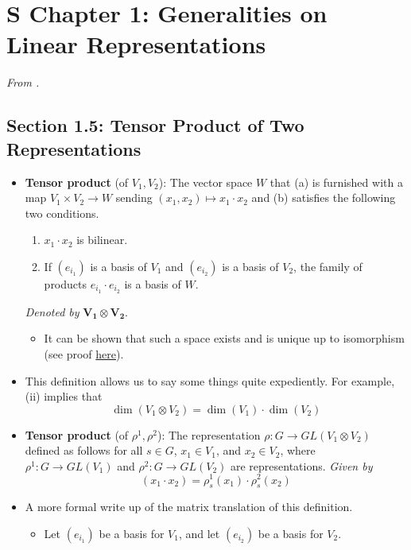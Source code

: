 \documentclass[../notes.tex]{subfiles}
\begin{document}
\section{S Chapter 1: Generalities on Linear Representations}
\emph{From \textcite{bib:Serre}.}
\subsection*{Section 1.5: Tensor Product of Two Representations}
\begin{itemize}
    \item \textbf{Tensor product} (of $V_1,V_2$): The vector space $W$ that (a) is furnished with a map $V_1\times V_2\to W$ sending $(x_1,x_2)\mapsto x_1\cdot x_2$ and (b) satisfies the following two conditions.
    \begin{enumerate}[label={(\roman*)}]
        \item $x_1\cdot x_2$ is bilinear.
        \item If $(e_{i_1})$ is a basis of $V_1$ and $(e_{i_2})$ is a basis of $V_2$, the family of products $e_{i_1}\cdot e_{i_2}$ is a basis of $W$.
    \end{enumerate}
    \emph{Denoted by} $\bm{V_1\otimes V_2}$.
    \begin{itemize}
        \item It can be shown that such a space exists and is unique up to isomorphism (see proof \href{https://www-users.cse.umn.edu/~garrett/m/algebra/notes/27.pdf}{here}).
    \end{itemize}
    \item This definition allows us to say some things quite expediently. For example, (ii) implies that
    \begin{equation*}
        \dim(V_1\otimes V_2) = \dim(V_1)\cdot\dim(V_2)
    \end{equation*}
    \item \textbf{Tensor product} (of $\rho^1,\rho^2$): The representation $\rho:G\to GL(V_1\otimes V_2)$ defined as follows for all $s\in G$, $x_1\in V_1$, and $x_2\in V_2$, where $\rho^1:G\to GL(V_1)$ and $\rho^2:G\to GL(V_2)$ are representations. \emph{Given by}
    \begin{equation*}
        [\rho_s^1\otimes\rho_s^2](x_1\cdot x_2) = \rho_s^1(x_1)\cdot\rho_s^2(x_2)
    \end{equation*}
    \item A more formal write up of the matrix translation of this definition.
    \begin{itemize}
        \item Let $(e_{i_1})$ be a basis for $V_1$, and let $(e_{i_2})$ be a basis for $V_2$.

\end{itemize}
\end{itemize}
\end{document}
